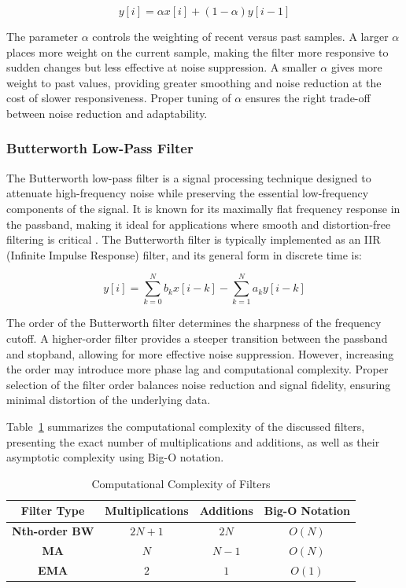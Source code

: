 \documentclass[conference]{IEEEtran}
\begin{document}
\begin{equation}
y[i] = \alpha x[i] + (1 - \alpha) y[i - 1]
\label{eq:ema}
\end{equation}

The parameter \( \alpha \) controls the weighting of recent versus past samples. A larger \( \alpha \) places more weight on the current sample, making the filter more responsive to sudden changes but less effective at noise suppression. A smaller \( \alpha \) gives more weight to past values, providing greater smoothing and noise reduction at the cost of slower responsiveness. Proper tuning of \( \alpha \) ensures the right trade-off between noise reduction and adaptability.

\subsubsection{\textbf{Butterworth Low-Pass Filter}}

The Butterworth low-pass filter is a signal processing technique designed to attenuate high-frequency noise while preserving the essential low-frequency components of the signal. It is known for its maximally flat frequency response in the passband, making it ideal for applications where smooth and distortion-free filtering is critical \cite{manolakis2011}. The Butterworth filter is typically implemented as an IIR (Infinite Impulse Response) filter, and its general form in discrete time is:

\begin{equation}
y[i] = \sum_{k=0}^{N} b_k x[i-k] - \sum_{k=1}^{N} a_k y[i-k]
\label{eq:butterworth}
\end{equation}

The order of the Butterworth filter determines the sharpness of the frequency cutoff. A higher-order filter provides a steeper transition between the passband and stopband, allowing for more effective noise suppression. However, increasing the order may introduce more phase lag and computational complexity. Proper selection of the filter order balances noise reduction and signal fidelity, ensuring minimal distortion of the underlying data.

Table~\ref{table:complexity} summarizes the computational complexity of the discussed filters, presenting the exact number of multiplications and additions, as well as their asymptotic complexity using Big-O notation.


\begin{table}[htbp]
\caption{Computational Complexity of Filters}
\begin{center}
\begin{tabular}{|c|c|c|c|}
\hline
\textbf{Filter Type} & \textbf{Multiplications} & \textbf{Additions} & \textbf{Big-O Notation} \\ \hline
\textbf{Nth-order BW} & $2N + 1$ & $2N$ & $O(N)$ \\ \hline
\textbf{MA} & $N$ & $N - 1$ & $O(N)$ \\ \hline
\textbf{EMA} & $2$ & $1$ & $O(1)$ \\ \hline
\end{tabular}
\label{table:complexity}
\end{center}
\end{table}
\end{document}
